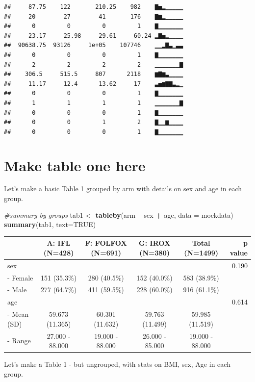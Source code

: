 \documentclass[fleqn,10pt,lineno]{wlpeerj} %
\newenvironment{Shaded}{\begin{snugshade}}{\end{snugshade}}
\newcommand{\CommentTok}[1]{\textcolor[rgb]{0.56,0.35,0.01}{\textit{#1}}}
\newcommand{\DataTypeTok}[1]{\textcolor[rgb]{0.13,0.29,0.53}{#1}}
\newcommand{\KeywordTok}[1]{\textcolor[rgb]{0.13,0.29,0.53}{\textbf{#1}}}
\newcommand{\NormalTok}[1]{#1}
\newcommand{\OperatorTok}[1]{\textcolor[rgb]{0.81,0.36,0.00}{\textbf{#1}}}
\newcommand{\OtherTok}[1]{\textcolor[rgb]{0.56,0.35,0.01}{#1}}
\newcommand{\StringTok}[1]{\textcolor[rgb]{0.31,0.60,0.02}{#1}}
\begin{document}
\begin{verbatim}
##     87.75    122       210.25    982    ▇▅▂▁▁▁▁▁
##     20        27        41       176    ▇▆▂▁▁▁▁▁
##      0         0         0         1    ▇▁▁▁▁▁▁▁
##     23.17     25.98     29.61     60.24 ▂▇▅▂▁▁▁▁
##  90638.75  93126     1e+05    107746    ▁▁▂▇▃▁▃▃
##      0         0         0         1    ▇▁▁▁▁▁▁▁
##      2         2         2         2    ▁▁▁▁▁▁▁▇
##    306.5     515.5     807      2118    ▆▇▆▃▁▁▁▁
##     11.17     12.4      13.62     17    ▃▅▆▇▇▃▂▁
##      0         0         0         1    ▇▁▁▁▁▁▁▁
##      1         1         1         1    ▁▁▁▁▁▁▁▇
##      0         0         0         1    ▇▁▁▁▁▁▁▁
##      0         0         1         2    ▇▁▁▆▁▁▁▁
##      0         0         0         1    ▇▁▁▁▁▁▁▁
\end{verbatim}

\hypertarget{make-table-one-here}{%
\section{Make table one here}\label{make-table-one-here}}

Let's make a basic Table 1 grouped by arm with details on sex and age in each group.

\begin{Shaded}
\begin{Highlighting}[]
\CommentTok{#summary by groups}
\NormalTok{tab1 <-}\StringTok{ }\KeywordTok{tableby}\NormalTok{(arm }\OperatorTok{~}\StringTok{ }\NormalTok{sex }\OperatorTok{+}\StringTok{ }\NormalTok{age, }\DataTypeTok{data =}\NormalTok{ mockdata)}
\KeywordTok{summary}\NormalTok{(tab1, }\DataTypeTok{text=}\OtherTok{TRUE}\NormalTok{)}
\end{Highlighting}
\end{Shaded}

\begin{longtable}[]{@{}lccccr@{}}
\toprule
& A: IFL (N=428) & F: FOLFOX (N=691) & G: IROX (N=380) & Total (N=1499) & p value\tabularnewline
\midrule
\endhead
sex & & & & & 0.190\tabularnewline
- Female & 151 (35.3\%) & 280 (40.5\%) & 152 (40.0\%) & 583 (38.9\%) &\tabularnewline
- Male & 277 (64.7\%) & 411 (59.5\%) & 228 (60.0\%) & 916 (61.1\%) &\tabularnewline
age & & & & & 0.614\tabularnewline
- Mean (SD) & 59.673 (11.365) & 60.301 (11.632) & 59.763 (11.499) & 59.985 (11.519) &\tabularnewline
- Range & 27.000 - 88.000 & 19.000 - 88.000 & 26.000 - 85.000 & 19.000 - 88.000 &\tabularnewline
\bottomrule
\end{longtable}

Let's make a Table 1 - but ungrouped, with stats on BMI, sex, Age in each group.
\end{document}
